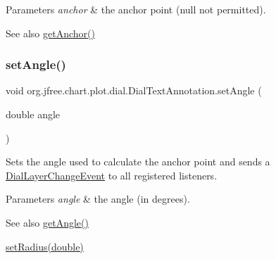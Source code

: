 \begin{DoxyParams}{Parameters}
{\em anchor} & the anchor point ({\ttfamily null} not permitted).\\
\hline
\end{DoxyParams}
\begin{DoxySeeAlso}{See also}
\mbox{\hyperlink{classorg_1_1jfree_1_1chart_1_1plot_1_1dial_1_1_dial_text_annotation_a784089eb314baac5cacb0973fb328b92}{get\+Anchor()}} 
\end{DoxySeeAlso}
\mbox{\label{classorg_1_1jfree_1_1chart_1_1plot_1_1dial_1_1_dial_text_annotation_a10212bd12fd87d4c9c8a89658fea5d09}} 
\subsubsection{\texorpdfstring{set\+Angle()}{setAngle()}}
{\footnotesize\ttfamily void org.\+jfree.\+chart.\+plot.\+dial.\+Dial\+Text\+Annotation.\+set\+Angle (\begin{DoxyParamCaption}\item[{double}]{angle }\end{DoxyParamCaption})}

Sets the angle used to calculate the anchor point and sends a \mbox{\hyperlink{classorg_1_1jfree_1_1chart_1_1plot_1_1dial_1_1_dial_layer_change_event}{Dial\+Layer\+Change\+Event}} to all registered listeners.


\begin{DoxyParams}{Parameters}
{\em angle} & the angle (in degrees).\\
\hline
\end{DoxyParams}
\begin{DoxySeeAlso}{See also}
\mbox{\hyperlink{classorg_1_1jfree_1_1chart_1_1plot_1_1dial_1_1_dial_text_annotation_ac5edd17a18442f02b1fda90fdc71b5ba}{get\+Angle()}} 

\mbox{\hyperlink{classorg_1_1jfree_1_1chart_1_1plot_1_1dial_1_1_dial_text_annotation_a965ee047f464d6e4d7b8ec01f18bf913}{set\+Radius(double)}} 
\end{DoxySeeAlso}
\mbox{\label{classorg_1_1jfree_1_1chart_1_1plot_1_1dial_1_1_dial_text_annotation_ad278fcc853d254432be2fe0d9d9e15e5}} 

